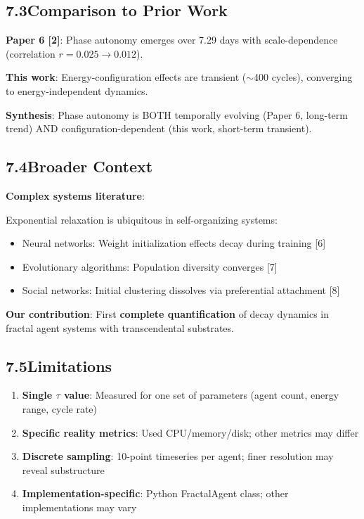 \documentclass[11pt]{article}
\begin{document}
\subsection*{7.3\quad Comparison to Prior Work}

\noindent\textbf{Paper 6 [2]}: Phase autonomy emerges over 7.29 days with scale-dependence (correlation $r = 0.025 \rightarrow 0.012$).

\noindent\textbf{This work}: Energy-configuration effects are transient ($\sim$400 cycles), converging to energy-independent dynamics.

\noindent\textbf{Synthesis}: Phase autonomy is BOTH temporally evolving (Paper 6, long-term trend) AND configuration-dependent (this work, short-term transient).

\subsection*{7.4\quad Broader Context}

\noindent\textbf{Complex systems literature}:

Exponential relaxation is ubiquitous in self-organizing systems:
\begin{itemize}
    \item Neural networks: Weight initialization effects decay during training [6]
    \item Evolutionary algorithms: Population diversity converges [7]
    \item Social networks: Initial clustering dissolves via preferential attachment [8]
\end{itemize}

\noindent\textbf{Our contribution}: First \textbf{complete quantification} of decay dynamics in fractal agent systems with transcendental substrates.

\subsection*{7.5\quad Limitations}

\begin{enumerate}
    \item \textbf{Single $\tau$ value}: Measured for one set of parameters (agent count, energy range, cycle rate)
    \item \textbf{Specific reality metrics}: Used CPU/memory/disk; other metrics may differ
    \item \textbf{Discrete sampling}: 10-point timeseries per agent; finer resolution may reveal substructure
    \item \textbf{Implementation-specific}: Python FractalAgent class; other implementations may vary
\end{enumerate}
\end{document}
